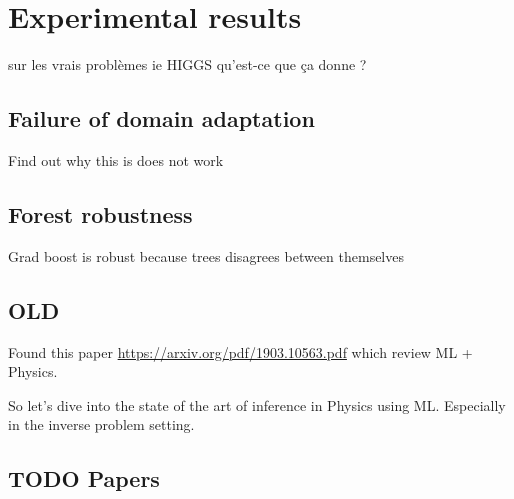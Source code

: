 
\chapter{Experimental results}
\label{chap:systml}
\ifpdf
    \graphicspath{{Chapter4/Figs/Raster/}{Chapter4/Figs/PDF/}{Chapter4/Figs/}}
\else
    \graphicspath{{Chapter4/Figs/Vector/}{Chapter4/Figs/}}
\fi


sur les vrais problèmes ie HIGGS qu'est-ce que ça donne ?

\section{Failure of domain adaptation} %
\label{sec:failure_of_domain_adaptation}


Find out why this is does not work


\section{Forest robustness} %
\label{sec:forest_robustness}

Grad boost is robust because trees disagrees between themselves






\section{OLD} %


Found this paper \url{https://arxiv.org/pdf/1903.10563.pdf} which review ML + Physics.

So let's dive into the state of the art of inference in Physics using ML.
Especially in the inverse problem setting.

\section{ TODO Papers }

